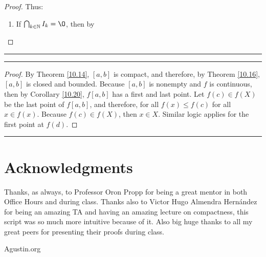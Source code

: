 \documentclass[openany, amssymb, psamsfonts]{amsart}
\newcommand{\bbN}{\mathbb{N}}
\renewcommand{\emptyset}{\O}
\theoremstyle{definition}
\numberwithin{equation}{section}
\begin{document}
\begin{enumerate}
\begin{enumerate}
\begin{proof}
Thus:
\begin{enumerate}
\item If $\bigcap_{k\in \bbN}I_k = \emptyset$, then by 
\end{enumerate}
\end{proof}\vspace{4pt}     \hrule   \vspace{4pt}
\end{enumerate}
\end{enumerate}

\vspace{4pt}     \hrule   \vspace{4pt}  \begin{proof}
By Theorem \ref{10.14}, $[a,b]$ is compact, and therefore, by Theorem \ref{10.16}, $[a,b]$ is closed and bounded. Because $[a,b]$ is nonempty and $f$ is continuous, then by Corollary \ref{10.20}, $f[a,b]$ has a first and last point. Let $f(c)\in f(X)$ be the last point of $f[a,b]$, and therefore, for all $f(x)\leq f(c)$ for all $x\in f(x)$. Because $f(c) \in f(X)$, then $x\in X$. Similar logic applies for the first point at $f(d)$.
\end{proof}\vspace{4pt}     \hrule   \vspace{4pt}





\section*{Acknowledgments} 
Thanks, as always, to Professor Oron Propp for being a great mentor in both Office Hours and during class. Thanks also to Victor Hugo Almendra Hernández for being an amazing TA and having an amazing lecture on compactness, this script was so much more intuitive because of it. Also big huge thanks to all my great peers for presenting their proofs during class.
\begin{thebibliography}{9}

 Agustin.org


\end{thebibliography}
\end{document}
